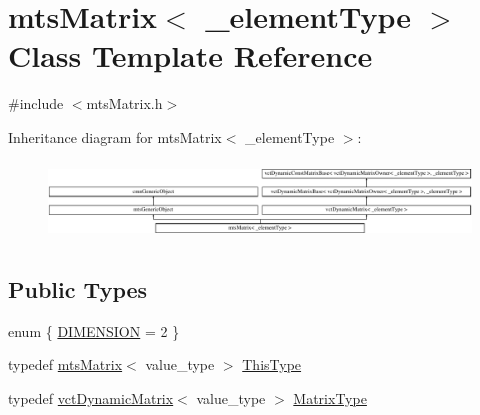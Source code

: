 \hypertarget{classmts_matrix}{}\section{mts\+Matrix$<$ \+\_\+element\+Type $>$ Class Template Reference}
\label{classmts_matrix}


{\ttfamily \#include $<$mts\+Matrix.\+h$>$}

Inheritance diagram for mts\+Matrix$<$ \+\_\+element\+Type $>$\+:\begin{figure}[H]
\begin{center}
\leavevmode
\includegraphics[height=2.101313cm]{de/d36/classmts_matrix}
\end{center}
\end{figure}
\subsection*{Public Types}
\begin{DoxyCompactItemize}
\item 
enum \{ \hyperlink{classmts_matrix_ae82a0a7b77148177bfd8988bbdda882aa6aacbb86e5a9e8a2865163a7182717de}{D\+I\+M\+E\+N\+S\+I\+O\+N} = 2
 \}
\item 
typedef \hyperlink{classmts_matrix}{mts\+Matrix}$<$ value\+\_\+type $>$ \hyperlink{classmts_matrix_abebbde6e54b4a6e574c42a99bc015524}{This\+Type}
\item 
typedef \hyperlink{classvct_dynamic_matrix}{vct\+Dynamic\+Matrix}$<$ value\+\_\+type $>$ \hyperlink{classmts_matrix_af0f57fd565d954a7485dcb26a384d64a}{Matrix\+Type}
\end{DoxyCompactItemize}
